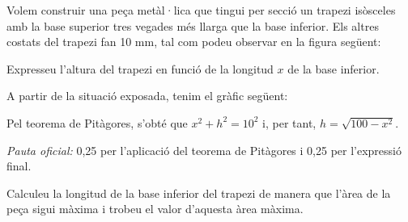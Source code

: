 Volem construir una peça metàl·lica que tingui per secció un trapezi isòsceles amb la base superior tres vegades
més llarga que la base inferior. Els altres costats del trapezi fan 10 mm, tal com podeu observar en la figura
següent:
\begin{center}
\end{center}

\begin{apartats}

Expresseu l'altura del trapezi en funció de la longitud $x$ de la base inferior.

\begin{solucio}
A partir de la situació exposada, tenim el gràfic següent:
\begin{center}
\end{center}
Pel teorema de Pitàgores, s'obté que $x^2+h^2=10^2$ i, per tant, $\boxed{h=\sqrt{100-x^2}}$.

\textit{Pauta oficial:} 0,25 per l'aplicació del teorema de Pitàgores i 0,25 per l'expressió final.
\end{solucio}

Calculeu la longitud de la base inferior del trapezi de manera que l'àrea de la peça sigui màxima i trobeu el
valor d'aquesta àrea màxima.


\end{apartats}
